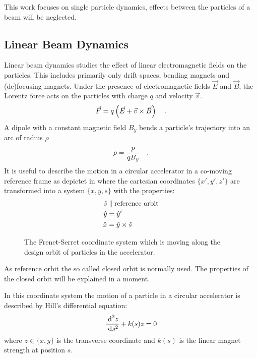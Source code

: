This work focuses on single particle dynamics, effects between the particles of a beam will be
neglected. 

\subsection{Linear Beam Dynamics}

Linear beam dynamics studies the effect of linear electromagnetic fields on the particles.
This includes primarily only drift spaces, bending magnets and (de)focusing magnets. Under the presence
of electromagnetic fields $\vec{E}$ and $\vec{B}$, the Lorentz force acts on the particles with charge
$q$ and velocity $\vec{v}$.
%
\begin{equation}
    \vec{F} = q\left(\vec{E} + \vec{v} \times \vec{B}\right)
    \quad .
    \label{eq_lorentz_force}
\end{equation}
%
A dipole with a constant magnetic field $B_y$ bends a particle's trajectory into an arc of radius $\rho$
%
\begin{equation}
    \rho = \frac{p}{qB_y}
    \quad .
    \label{eq_acc_radius}
\end{equation}
%
It is useful to describe the motion in a circular accelerator in a co-moving reference frame as
depictet in  where the cartesian coordinates $\{x', y', z'\}$ are
transformed into a system $\{x,y,s\}$ with the properties:
%
\begin{align}
    \hat{s} &\parallel \text{reference orbit}\notag\\
    \hat{y} &= \hat{y}'\notag\\
    \hat{x} &= \hat{y} \times \hat{s}
\end{align}
%
\begin{figure}[h]
    
    \caption{
        The Frenet-Serret coordinate system which is moving along the design orbit of particles
        in the accelerator.
    }
    \label{fig_frenet_serret}
\end{figure}
%
As reference orbit the so called closed orbit is normally used. The properties of the closed orbit
will be explained in a moment.

In this coordinate system the motion of a particle in a circular accelerator is described by Hill's
differential equation:
%
\begin{equation}
    \frac{\;\text{d}^2 z}{\;\text{d} s^2} + k(s)z = 0
    \label{eq_hills}
\end{equation}
%
where $z \in \{x,y\}$ is the transverse coordinate and $k(s)$ is the linear magnet strength at
position $s$.

